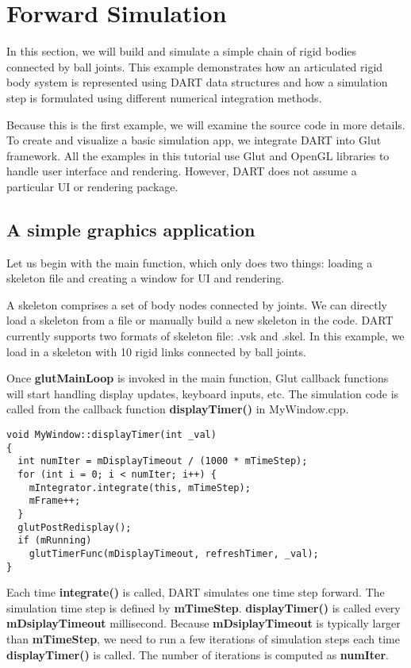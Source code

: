 \section{Forward Simulation}
In this section, we will build and simulate a simple chain of rigid
bodies connected by ball joints. This example demonstrates how an
articulated rigid body system is represented using DART data
structures and how a simulation step is formulated using different
numerical integration methods.

Because this is the first example, we will examine the source code in
more details. To create and visualize a basic simulation app, we
integrate DART into Glut framework. All the examples in this tutorial
use Glut and OpenGL libraries to handle user interface and
rendering. However, DART does not assume a particular UI or rendering
package. 


\subsection{A simple graphics application}
Let us begin with the main function, which only does two things:
loading a skeleton file and creating a window for UI and rendering.

A skeleton comprises a set of body nodes connected by
joints. We can directly load a skeleton from a file or manually build a new
skeleton in the code. DART currently supports two formats of skeleton
file: .vsk and .skel. In this example, we load in a skeleton with 10
rigid links connected by ball joints. 

Once \textbf{glutMainLoop} is invoked in the main function, Glut
callback functions will start handling display updates, keyboard
inputs, etc. The simulation code is called from the callback function
\textbf{displayTimer()} in MyWindow.cpp.

\ttfamily
\begin{lstlisting}[label=displayTimer,caption=displayTimer]
void MyWindow::displayTimer(int _val)
{
  int numIter = mDisplayTimeout / (1000 * mTimeStep);
  for (int i = 0; i < numIter; i++) {
    mIntegrator.integrate(this, mTimeStep);
    mFrame++;
  }
  glutPostRedisplay();
  if (mRunning)	
    glutTimerFunc(mDisplayTimeout, refreshTimer, _val);
}
\end{lstlisting}
\rmfamily 
Each time \textbf{integrate()} is called, DART simulates one
time step forward. The simulation time step is defined by
\textbf{mTimeStep}. \textbf{displayTimer()} is called every
\textbf{mDsiplayTimeout} millisecond. Because \textbf{mDsiplayTimeout}
is typically larger than \textbf{mTimeStep}, we need to run a few
iterations of simulation steps each time \textbf{displayTimer()} is
called. The number of iterations is computed as \textbf{numIter}.

